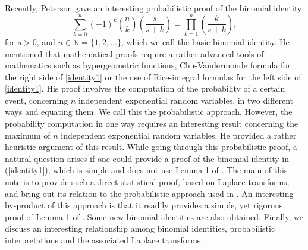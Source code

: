 \documentclass[11pt]{amsart}
\numberwithin{equation}{section}
\begin{document}
Recently, Peterson \cite{peter} gave an interesting probabilistic  proof of the binomial identity
\begin{equation}\label{identity1}
 \sum_{k=0}^{n}(-1)^{k}\binom{n}{k}\left(\frac{s}{s+k}\right)=\prod_{k=1}^{n}\left(\frac{k}{s+k}\right),
\end{equation}
for $s>0$, and $n\in\mathbb{N}=\{1,2,\ldots\}$,
which we call the basic binomial identity.
He mentioned that mathematical proofs require a rather advanced tools of mathematics such as hypergeometric functions, Chu-Vandermonde formula \cite{gasper} for the right side of \eqref{identity1} or the use of Rice-integral formulas \cite{flaj} for the left side of \eqref{identity1}.
His proof involves the computation of the probability of a certain event, concerning $n$ independent exponential random variables, in two different ways and equating them. We call this the probabilistic approach. However, the probability computation in one way requires an interesting result \cite[Lemma 1]{peter} concerning the maximum of $n$ independent exponential random variables. He provided a rather heuristic argument of this result.
While going through this probabilistic proof, a natural question arises if one could provide a proof of the binomial identity in (\ref{identity1}), which is simple and does not use Lemma 1 of \cite{peter}. The main of this note is to provide such a direct statistical proof, based on Laplace transforms, and bring out its relation to the probabilistic approach used in \cite{peter}. An interesting by-product of this approach is that it readily provides a simple, yet rigorous, proof of Lemma 1 of \cite{peter}. Some new binomial identities are also obtained. Finally, we discuss an interesting relationship among binomial identities, probabilistic interpretations and the associated Laplace transforms.

\vspace{0.1cm}
\end{document}
